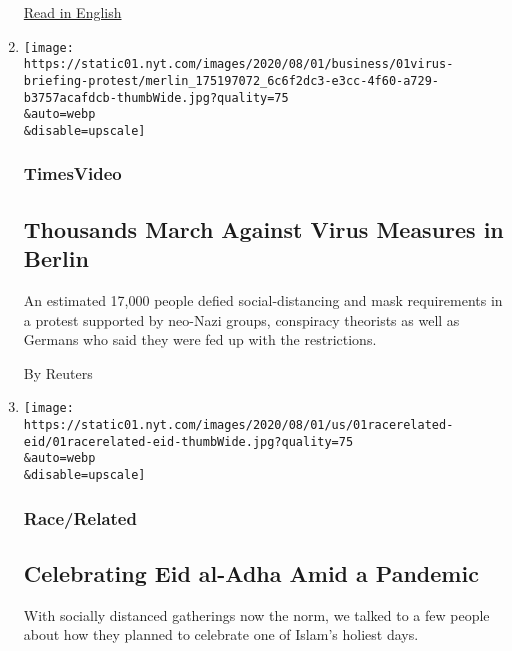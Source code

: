 \begin{enumerate}
  \href{https://www.nytimes.com/2020/07/30/opinion/coronavirus-aerosols.html}{Read
  in English}
\item
  \href{/video/world/europe/100000007268465/coronavirus-protest-germany.html}{}

  \texttt{[image: https://static01.nyt.com/images/2020/08/01/business/01virus-briefing-protest/merlin\_175197072\_6c6f2dc3-e3cc-4f60-a729-b3757acafdcb-thumbWide.jpg?quality=75\\\&auto=webp\\\&disable=upscale]}

  \hypertarget{timesvideo}{%
  \subsubsection{TimesVideo}\label{timesvideo}}

  \hypertarget{thousands-march-against-virus-measures-in-berlin}{%
  \subsection{Thousands March Against Virus Measures in
  Berlin}\label{thousands-march-against-virus-measures-in-berlin}}

  An estimated 17,000 people defied social-distancing and mask
  requirements in a protest supported by neo-Nazi groups, conspiracy
  theorists as well as Germans who said they were fed up with the
  restrictions.

  By Reuters
\item
  \href{/2020/08/01/us/eid-al-adha-coronavirus.html}{}

  \texttt{[image: https://static01.nyt.com/images/2020/08/01/us/01racerelated-eid/01racerelated-eid-thumbWide.jpg?quality=75\\\&auto=webp\\\&disable=upscale]}

  \hypertarget{racerelated}{%
  \subsubsection{Race/Related}\label{racerelated}}

  \hypertarget{celebrating-eid-al-adha-amid-a-pandemic}{%
  \subsection{Celebrating Eid al-Adha Amid a
  Pandemic}\label{celebrating-eid-al-adha-amid-a-pandemic}}

  With socially distanced gatherings now the norm, we talked to a few
  people about how they planned to celebrate one of Islam's holiest
  days.


\end{enumerate}

